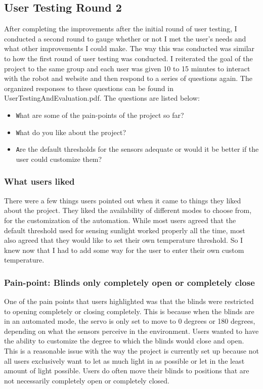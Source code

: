 \documentclass[10pt,twocolumn]{article}
\begin{document}
\subsection{User Testing Round 2}
After completing the improvements after the initial round of user testing, I conducted a second round to gauge whether or not I met the user’s needs and what other improvements I could make. The way this was conducted was similar to how the first round of user testing was conducted. I reiterated the goal of the project to the same group and each user was given 10 to 15 minutes to interact with the robot and website and then respond to a series of questions again. The organized responses to these questions can be found in UserTestingAndEvaluation.pdf. The questions are listed below:

\begin{itemize}
    \item \texttt What are some of the pain-points of the project so far?
    \item \texttt What do you like about the project?
    \item \texttt Are the default thresholds for the sensors adequate or would it be better if the user could customize them?
\end{itemize}

\subsubsection{What users liked}
There were a few things users pointed out when it came to things they liked about the project. They liked the availability of different modes to choose from, for the customization of the automation. While most users agreed that the default threshold used for sensing sunlight worked properly all the time, most also agreed that they would like to set their own temperature threshold. So I knew now that I had to add some way for the user to enter their own custom temperature.

\subsubsection{Pain-point: Blinds only completely open or completely close}
One of the pain points that users highlighted was that the blinds were restricted to opening completely or closing completely. This is because when the blinds are in an automated mode, the servo is only set to move to 0 degrees or 180 degrees, depending on what the sensors perceive in the environment. Users wanted to have the ability to customize the degree to which the blinds would close and open. This is a reasonable issue with the way the project is currently set up because not all users exclusively want to let as much light in as possible or let in the least amount of light possible. Users do often move their blinds to positions that are not necessarily completely open or completely closed.
\end{document}
